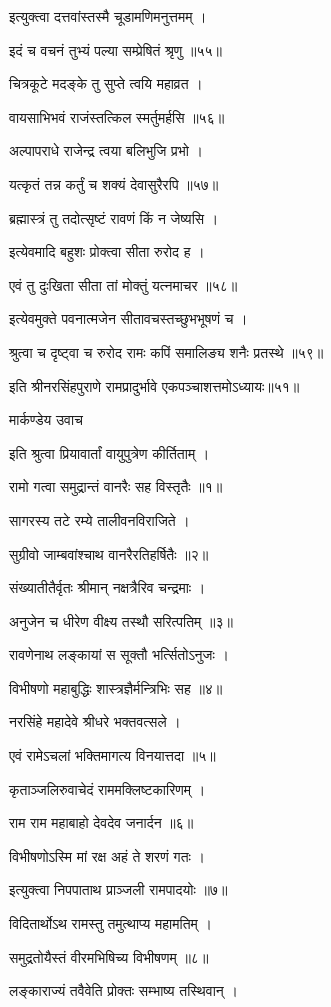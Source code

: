 इत्युक्त्वा दत्तवांस्तस्मै चूडामणिमनुत्तमम् ।

इदं च वचनं तुभ्यं पल्या सम्प्रेषितं श्रृणु ॥५५॥

चित्रकूटे मदङ्के तु सुप्ते त्वयि महाव्रत ।

वायसाभिभवं राजंस्तत्किल स्मर्तुमर्हसि ॥५६॥

अल्पापराधे राजेन्द्र त्वया बलिभुजि प्रभो ।

यत्कृतं तन्न कर्तुं च शक्यं देवासुरैरपि ॥५७॥

ब्रह्मास्त्रं तु तदोत्सृष्टं रावणं किं न जेष्यसि ।

इत्येवमादि बहुशः प्रोक्त्वा सीता रुरोद ह ।

एवं तु दुःखिता सीता तां मोक्तुं यत्नमाचर ॥५८॥

इत्येवमुक्ते पवनात्मजेन सीतावचस्तच्छुभभूषणं च ।

श्रुत्वा च दृष्ट्वा च रुरोद रामः कपिं समालिङ्य शनैः प्रतस्थे ॥५९॥

इति श्रीनरसिंहपुराणे रामप्रादुर्भावे एकपञ्चाशत्तमोऽध्यायः॥५१॥


मार्कण्डेय उवाच

इति श्रुत्वा प्रियावार्तां वायुपुत्रेण कीर्तिताम् ।

रामो गत्वा समुद्रान्तं वानरैः सह विस्तृतैः ॥१॥

सागरस्य तटे रम्ये तालीवनविराजिते ।

सुग्रीवो जाम्बवांश्चाथ वानरैरतिहर्षितैः ॥२॥

संख्यातीतैर्वृतः श्रीमान् नक्षत्रैरिव चन्द्रमाः ।

अनुजेन च धीरेण वीक्ष्य तस्थौ सरित्पतिम् ॥३॥

रावणेनाथ लङ्कायां स सूक्तौ भर्त्सितोऽनुजः ।

विभीषणो महाबुद्धिः शास्त्रज्ञैर्मन्त्रिभिः सह ॥४॥

नरसिंहे महादेवे श्रीधरे भक्तवत्सले ।

एवं रामेऽचलां भक्तिमागत्य विनयात्तदा ॥५॥

कृताञ्जलिरुवाचेदं राममक्लिष्टकारिणम् ।

राम राम महाबाहो देवदेव जनार्दन ॥६॥

विभीषणोऽस्मि मां रक्ष अहं ते शरणं गतः ।

इत्युक्त्वा निपपाताथ प्राञ्जली रामपादयोः ॥७॥

विदितार्थोऽथ रामस्तु तमुत्थाप्य महामतिम् ।

समुद्रतोयैस्तं वीरमभिषिच्य विभीषणम् ॥८॥

लङ्काराज्यं तवैवेति प्रोक्तः सम्भाष्य तस्थिवान् ।


